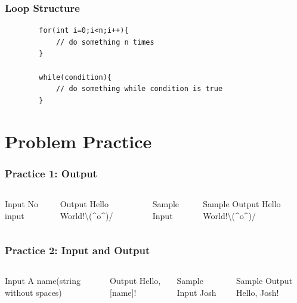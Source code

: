 \documentclass[xcolor=dvipsnames]{beamer}
\begin{document}
    \begin{frame}[fragile]
        \frametitle{Loop Structure}
        \begin{verbatim}
        for(int i=0;i<n;i++){
            // do something n times
        }

        while(condition){
            // do something while condition is true
        }
        \end{verbatim}
    \end{frame}

    \section{Problem Practice}
    \begin{frame}
        \frametitle{Practice 1: Output}
        \begin{columns}
            \begin{block}{Input}
            No input
            \end{block}
            \begin{block}{Output}
            Hello World!\;\textbackslash(\;\^\;o\;\^\;)/
            \end{block}
            \begin{block}{Sample Input}
            \end{block}
            \begin{block}{Sample Output}
            Hello World!\;\textbackslash(\;\^\;o\;\^\;)/
            \end{block}
        \end{columns}
    \end{frame}
    \begin{frame}
        \frametitle{Practice 2: Input and Output}
        \begin{columns}
            \begin{block}{Input}
            A name(string without spaces)
            \end{block}
            \begin{block}{Output}
            Hello, [name]! 
            \end{block}
            \begin{block}{Sample Input}
            Josh
            \end{block}
            \begin{block}{Sample Output}
            Hello, Josh! 
            \end{block}
        \end{columns}
    \end{frame}
\end{document}
